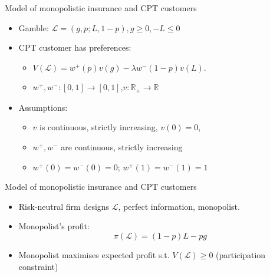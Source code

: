        \begin{frame}{Model of monopolistic insurance and CPT customers}
           \begin{itemize}
               \item Gamble: $\mathcal{L} =(g, p; L, 1 - p), g \geq 0, -L\leq 0 $\medskip
               \item CPT  customer has preferences:\medskip
               \begin{itemize}
                \item $V(\mathcal{L} )= w^{+}(p)v(g)-\lambda w^{-}(1-p)v(L).$\medskip
                \item $w^{+},w^{-}:[0,1] \longrightarrow [0,1]$,\quad $ v:\mathbb{R}_{+} \longrightarrow \mathbb{R}$\medskip
               \end{itemize}\medskip
               \item Assumptions:\medskip
               \begin{itemize}
                \item $v$ is continuous, strictly increasing, $v(0)=0$,\medskip
                \item $ w^{+},w^{-}$ are continuous, strictly increasing\medskip
                \item $w^{+}(0)=w^{-}(0)=0$; $w^{+}(1)=w^{-}(1)=1$\medskip
               \end{itemize}
           \end{itemize}
       \end{frame}

       \begin{frame}{Model of monopolistic insurance and CPT customers}
        \begin{itemize}
            \item Risk-neutral firm designs $\mathcal{L}$, perfect information, monopolist.\bigskip
            \item Monopolist's profit: \[\pi(\mathcal{L})=(1-p)L-pg\]\bigskip
            \item Monopolist maximises expected profit s.t. $V(\mathcal{L})\geq 0$ (participation constraint)\bigskip
        \end{itemize}
    \end{frame}

